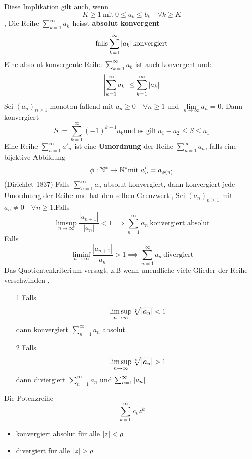 Diese Implikation gilt auch, wenn \[K \geq 1 \  \text{mit} \ 0 \leq a_k \leq b_k \quad \forall k \geq K\]
\sep
\Def[2.45] Die Reihe \(\sum_{k=1}^{\infty} a_{k}\) heisst \textbf{absolut konvergent}
\[\text{falls} \sum_{k=1}^{\infty} \left\lvert a_{k} \right\rvert \text{konvergiert}\] \newline
\Satz[2.46] Eine absolut konvergente Reihe  \(\sum_{k=1}^{\infty} a_{k}\) ist auch konvergent und:
\[\left\lvert \sum_{k=1}^{\infty} a_{k} \right\rvert \leq \sum_{k=1}^{\infty} \left\lvert a_{k} \right\rvert\] \newline
\Satz[4.8 (Leibniz 1682)] Sei \((a_n)_{n \geq 1}\) monoton fallend mit \(a_n \geq 0 \quad \forall n \geq 1\) und \(\lim\limits_{n \rightarrow \infty} a_n = 0\). Dann konvergiert
\[S := \sum_{k=1}^{\infty} (-1)^{k+1}a_k \text{und es gilt} \  a_1 - a_2 \leq S \leq a_1\]
\Def[2.50] Eine Reihe \(\sum_{n=1}^{\infty} a'_n\) ist eine \textbf{Umordnung} der Reihe \(\sum_{n=1}^{\infty} a_n\), falls eine bijektive Abbildung
\[\phi : \mathbb{N}^{*} \rightarrow \mathbb{N}^{*} \text{mit} \ a'_{n} = a_{\phi(n)}\] \newline
\Satz[2.52](Dirichlet 1837) Falls \(\sum_{n=1}^{\infty} a_n\) absolut konvergiert, dann konvergiert jede Umordnung der Reihe und hat den selben Grenzwert
\sep
\Satz[2.53(Quotientenkriterium] \newline Sei \((a_n)_{n \geq 1}\) mit \(a_n \neq 0 \quad \forall n \geq 1 \).Falls
\[\limsup\limits_{n \rightarrow \infty} \frac{\left|a_{n+1}\right|}{\left|a_{n}\right|}<1 \implies \sum_{n=1}^{\infty} a_{n} \ \text{konvergiert absolut}\]
Falls
\[\liminf\limits_{n \rightarrow \infty} \frac{\left|a_{n+1}\right|}{\left|a_{n}\right|}>1 \implies \sum_{n=1}^{\infty} a_{n} \ \text{divergiert}\]
 Das Quotientenkriterium versagt, z.B wenn unendliche viele Glieder der Reihe verschwinden
\sep
\Satz[2.56 Wurzelkriterium]
\begin{enumerate}
    \item [1] Falls \[\limsup\limits_{n \rightarrow \infty} \sqrt[n]{\left\lvert a_n \right\rvert} < 1\] dann konvergiert \(\sum_{n=1}^{\infty} a_n\) absolut
    \item [2] Falls \[\limsup\limits_{n \rightarrow \infty} \sqrt[n]{\left\lvert a_n \right\rvert} > 1\] dann diviergiert \(\sum_{n=1}^{\infty} a_n\) und \(\sum_{n=1}^{\infty}\left\lvert a_n \right\rvert \)
\end{enumerate}
\Korollar[2.57] Die Potenzreihe \[\sum_{k=0}^{\infty} c_kz^k\]
\begin{itemize}
    \item konvergiert absolut für alle $\left\lvert z \right\rvert < \rho$ 
    \item divergiert für alle $\left\lvert z \right\rvert > \rho$
    \end{itemize}
